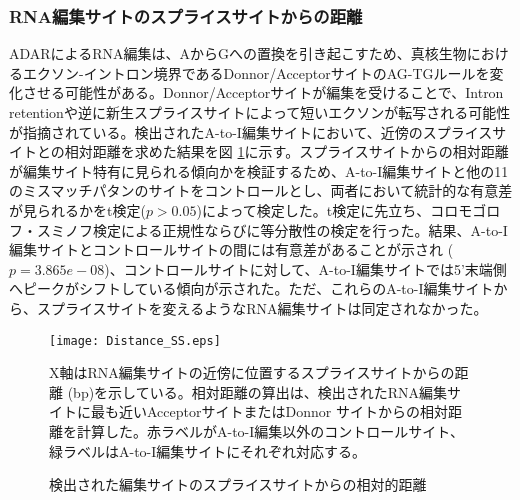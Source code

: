 \subsubsection{RNA編集サイトのスプライスサイトからの距離}
ADARによるRNA編集は、AからGへの置換を引き起こすため、真核生物におけるエクソン-イントロン境界であるDonnor/AcceptorサイトのAG-TGルールを変化させる可能性がある。Donnor/Acceptorサイトが編集を受けることで、Intron retentionや逆に新生スプライスサイトによって短いエクソンが転写される可能性が指摘されている。検出されたA-to-I編集サイトにおいて、近傍のスプライスサイトとの相対距離を求めた結果を図 \ref{fig:dist}に示す。スプライスサイトからの相対距離が編集サイト特有に見られる傾向かを検証するため、A-to-I編集サイトと他の11のミスマッチパタンのサイトをコントロールとし、両者において統計的な有意差が見られるかをt検定($p>0.05$)によって検定した。t検定に先立ち、コロモゴロフ・スミノフ検定による正規性ならびに等分散性の検定を行った。結果、A-to-I編集サイトとコントロールサイトの間には有意差があることが示され ($p=3.865e−08$)、コントロールサイトに対して、A-to-I編集サイトでは5'末端側へピークがシフトしている傾向が示された。ただ、これらのA-to-I編集サイトから、スプライスサイトを変えるようなRNA編集サイトは同定されなかった。

\begin{figure}[!h]
	\centering
	\texttt{[image: Distance\_SS.eps]}
	\caption{検出された編集サイトのスプライスサイトからの相対的距離}
	\begin{flushleft}
		\small{X軸はRNA編集サイトの近傍に位置するスプライスサイトからの距離 (bp)を示している。相対距離の算出は、検出されたRNA編集サイトに最も近いAcceptorサイトまたはDonnor サイトからの相対距離を計算した。赤ラベルがA-to-I編集以外のコントロールサイト、緑ラベルはA-to-I編集サイトにそれぞれ対応する。}
	\end{flushleft}
	\label{fig:dist}
\end{figure}
		
